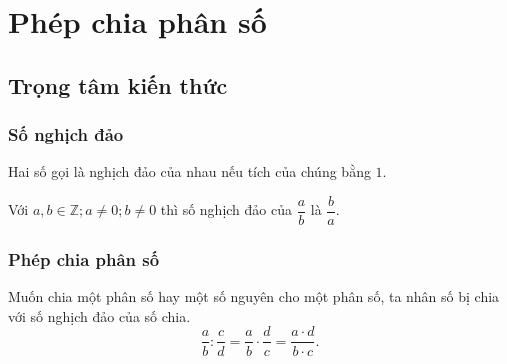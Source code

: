 
\section{Phép chia phân số}
\subsection{Trọng tâm kiến thức}
\subsubsection{Số nghịch đảo}
\begin{dn}
Hai số gọi là nghịch đảo của nhau nếu tích của chúng bằng $ 1 $.

Với $ a,b \in \mathbb{Z};a \ne 0; b \ne 0$ thì số nghịch đảo của $ \dfrac{a}{b} $ là $ \dfrac{b}{a} $.
\end{dn}
\subsubsection{Phép chia phân số}
\begin{note}
Muốn chia một phân số hay một số nguyên cho một phân số, ta nhân số bị chia với số nghịch đảo của số chia.
$$\dfrac{a}{b} : \dfrac{c}{d}=\dfrac{a}{b} \cdot \dfrac{d}{c}=\dfrac{a\cdot d}{b\cdot c}.$$
\end{note}


